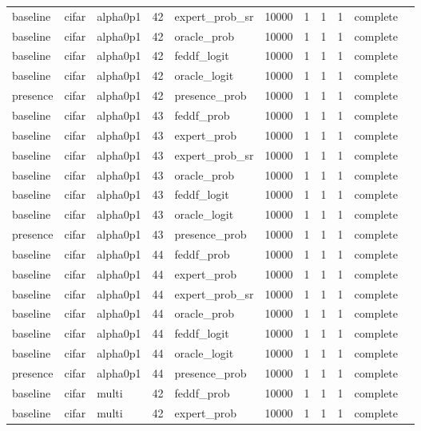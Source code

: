 \begin{tabular}{lllrlrrrrll}
baseline & cifar & alpha0p1 & 42 & expert\_prob\_sr & 10000 & 1 & 1 & 1 & complete &  \\
baseline & cifar & alpha0p1 & 42 & oracle\_prob & 10000 & 1 & 1 & 1 & complete &  \\
baseline & cifar & alpha0p1 & 42 & feddf\_logit & 10000 & 1 & 1 & 1 & complete &  \\
baseline & cifar & alpha0p1 & 42 & oracle\_logit & 10000 & 1 & 1 & 1 & complete &  \\
presence & cifar & alpha0p1 & 42 & presence\_prob & 10000 & 1 & 1 & 1 & complete &  \\
baseline & cifar & alpha0p1 & 43 & feddf\_prob & 10000 & 1 & 1 & 1 & complete &  \\
baseline & cifar & alpha0p1 & 43 & expert\_prob & 10000 & 1 & 1 & 1 & complete &  \\
baseline & cifar & alpha0p1 & 43 & expert\_prob\_sr & 10000 & 1 & 1 & 1 & complete &  \\
baseline & cifar & alpha0p1 & 43 & oracle\_prob & 10000 & 1 & 1 & 1 & complete &  \\
baseline & cifar & alpha0p1 & 43 & feddf\_logit & 10000 & 1 & 1 & 1 & complete &  \\
baseline & cifar & alpha0p1 & 43 & oracle\_logit & 10000 & 1 & 1 & 1 & complete &  \\
presence & cifar & alpha0p1 & 43 & presence\_prob & 10000 & 1 & 1 & 1 & complete &  \\
baseline & cifar & alpha0p1 & 44 & feddf\_prob & 10000 & 1 & 1 & 1 & complete &  \\
baseline & cifar & alpha0p1 & 44 & expert\_prob & 10000 & 1 & 1 & 1 & complete &  \\
baseline & cifar & alpha0p1 & 44 & expert\_prob\_sr & 10000 & 1 & 1 & 1 & complete &  \\
baseline & cifar & alpha0p1 & 44 & oracle\_prob & 10000 & 1 & 1 & 1 & complete &  \\
baseline & cifar & alpha0p1 & 44 & feddf\_logit & 10000 & 1 & 1 & 1 & complete &  \\
baseline & cifar & alpha0p1 & 44 & oracle\_logit & 10000 & 1 & 1 & 1 & complete &  \\
presence & cifar & alpha0p1 & 44 & presence\_prob & 10000 & 1 & 1 & 1 & complete &  \\
baseline & cifar & multi & 42 & feddf\_prob & 10000 & 1 & 1 & 1 & complete &  \\
baseline & cifar & multi & 42 & expert\_prob & 10000 & 1 & 1 & 1 & complete &  \\

\end{tabular}
